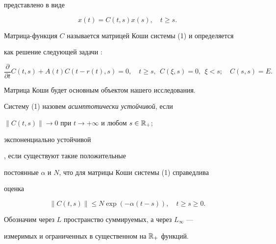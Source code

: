 представлено в виде \cite{4} 


$$ 


x(t)=C(t,s)x(s),\quad t\ge s. 


$$ 


 


Матрица-функция $C$ называется матрицей Коши системы (1) и определяется 


как решение следующей задачи \cite{4}: 


\begin{equation} 


\frac{\partial}{\partial t}C(t,s)+A(t)C(t-r(t),s)=0,\quad 


t\ge s, \ \ C(\xi,s)=0,\ \ \xi<s;\quad C(s,s)=E. 


\end{equation} 


 


Матрица Коши будет основным объектом нашего исследования. 


 


\begin{defnnonum} 


Систему (1) назовем {\it асимптотически устойчивой}, если 


$\|C(t,s)\|\to0$ при $t\to+\infty$ и любом $s\in\Bbb R_+$; {\it 


экспоненциально устойчивой}, если существуют такие положительные 


постоянные $\alpha$ и $N$, что для матрицы Коши системы (1) справедлива 


оценка 


$$


\|C(t,s)\|\le N\exp(-\alpha(t-s)),\quad t\ge s\ge0. 


$$


\end{defnnonum} 


 


Обозначим через $L$ пространство суммируемых, а через $L_\infty$ --- 


измеримых и ограниченных в существенном на $\Bbb R_+$ функций. 


 


